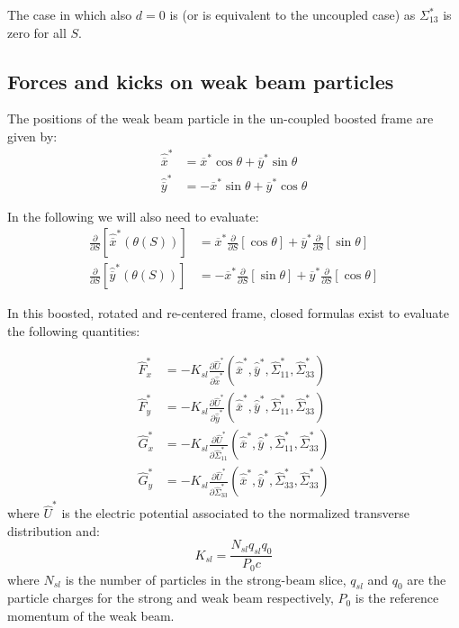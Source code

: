 The case in which also $d=0$ is (or is equivalent to the uncoupled case) as $\Sigma^*_{13}$ is zero for all $S$.




\subsection{Forces and kicks on weak beam particles}

The positions of the weak beam particle in the un-coupled boosted frame are given by:
\begin{align}
\hat{\overline{x}}^* &= \overline{x}^*\cos \theta  + \overline{y}^*\sin \theta \\
\hat{\overline{y}}^* &= -\overline{x}^*\sin \theta  + \overline{y}^* \cos \theta
\end{align}

In the following we will also need to evaluate:
\begin{align}
\frac{\partial }{\partial S} \left[\hat{\overline{x}}^*\left(\theta (S)\right) \right] &= 
\overline{x}^*  \frac{\partial }{\partial S} \left[ \cos \theta \right] 
+ \overline{y}^*\frac{\partial }{\partial S} \left[ \sin \theta \right]  \\
\frac{\partial }{\partial S} \left[\hat{\overline{y}}^*\left(\theta (S)\right) \right] &= 
-\overline{x}^*  \frac{\partial }{\partial S} \left[ \sin \theta \right] 
+ \overline{y}^*\frac{\partial }{\partial S} \left[ \cos \theta \right]  
\end{align}



In this boosted, rotated and re-centered frame, closed formulas exist to evaluate the following quantities:

\begin{align}
\hat{F}^*_x &= -K_{sl} \frac{\partial \hat{U}^*}{\partial \hat{\overline{x}}^*}\left(\hat{\overline{x}}^*, \hat{\overline{y}}^* , \hat{\Sigma}^*_{11}, \hat{\Sigma}^*_{33}\right) \label{eq:firstf}\\
%
\hat{F}^*_y &= -K_{sl}\frac{\partial \hat{U}^*}{\partial \hat{\overline{y}}^*}\left(\hat{\overline{x}}^*, \hat{\overline{y}}^* , \hat{\Sigma}^*_{11}, \hat{\Sigma}^*_{33}\right)\\
%
\hat{G}^*_x &= -K_{sl}\frac{\partial \hat{U}^*}{\partial \hat{\Sigma}^*_{11}}\left(\hat{\overline{x}}^*, \hat{\overline{y}}^* , \hat{\Sigma}^*_{11}, \hat{\Sigma}^*_{33}\right)\\
%
\hat{G}^*_y &= -K_{sl}\frac{\partial \hat{U}^*}{\partial \hat{\Sigma}^*_{33}}\left(\hat{\overline{x}}^*, \hat{\overline{y}}^* , \hat{\Sigma}^*_{33}, \hat{\Sigma}^*_{33} \right) \label{eq:lastf}
\end{align}
where $\hat{U}^*$ is the electric potential associated to the normalized transverse distribution and:
\begin{equation}
K_{sl} = \frac{N_{sl} q_{sl} q_0}{P_0 c}
\label{eq:factor}
\end{equation}
where $N_{sl}$ is the number of particles in the strong-beam slice, $q_{sl}$ and $q_0$ are the particle charges for the strong and weak beam respectively, $P_0$ is the reference momentum of the weak beam.

